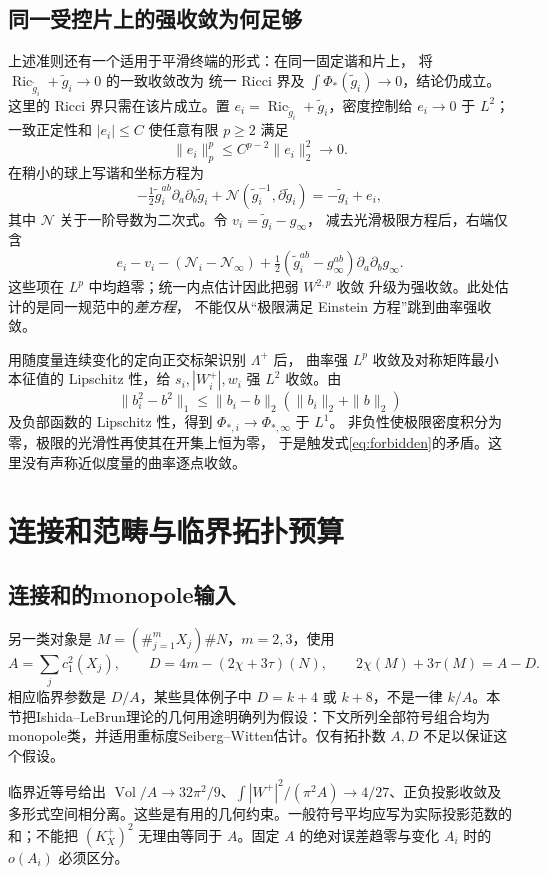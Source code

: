 \documentclass[UTF8,a4paper,11pt,fontset=fandol]{ctexart}
\numberwithin{equation}{section}
\theoremstyle{definition}
\newcommand{\Ric}{\operatorname{Ric}}
\newcommand{\Vol}{\operatorname{Vol}}
\begin{document}
\subsection{同一受控片上的强收敛为何足够}\label{sec:strong-density-bridge}
上述准则还有一个适用于平滑终端的形式：在同一固定谐和片上，
将 $\Ric_{\widetilde g_i}+\widetilde g_i\to0$ 的一致收敛改为
统一 Ricci 界及 $\int\Phi_*(\widetilde g_i)\to0$，结论仍成立。
这里的 Ricci 界只需在该片成立。置
$e_i=\Ric_{\widetilde g_i}+\widetilde g_i$，密度控制给 $e_i\to0$ 于 $L^2$；
一致正定性和 $|e_i|\le C$ 使任意有限 $p\ge2$ 满足
\[
\|e_i\|_p^p\le C^{p-2}\|e_i\|_2^2\longrightarrow0.
\]
在稍小的球上写谐和坐标方程为
\[
-\tfrac12\widetilde g_i^{ab}\partial_a\partial_b\widetilde g_i
 +\mathcal N(\widetilde g_i^{-1},\partial\widetilde g_i)
=-\widetilde g_i+e_i,
\]
其中 $\mathcal N$ 关于一阶导数为二次式。令 $v_i=\widetilde g_i-g_\infty$，
减去光滑极限方程后，右端仅含
\[
e_i-v_i-(\mathcal N_i-\mathcal N_\infty)
 +\tfrac12(\widetilde g_i^{ab}-g_\infty^{ab})\partial_a\partial_bg_\infty.
\]
这些项在 $L^p$ 中均趋零；统一内点估计因此把弱 $W^{2,p}$ 收敛
升级为强收敛。此处估计的是同一规范中的\emph{差方程}，
不能仅从“极限满足 Einstein 方程”跳到曲率强收敛。

用随度量连续变化的定向正交标架识别 $\Lambda^+$ 后，
曲率强 $L^p$ 收敛及对称矩阵最小本征值的 Lipschitz 性，给
$s_i,|W_i^+|,w_i$ 强 $L^2$ 收敛。由
\[
\|b_i^2-b^2\|_1\le\|b_i-b\|_2(\|b_i\|_2+\|b\|_2)
\]
及负部函数的 Lipschitz 性，得到 $\Phi_{*,i}\to\Phi_{*,\infty}$ 于 $L^1$。
非负性使极限密度积分为零，极限的光滑性再使其在开集上恒为零，
于是触发式\eqref{eq:forbidden}的矛盾。这里没有声称近似度量的曲率逐点收敛。

\section{连接和范畴与临界拓扑预算}
\subsection{连接和的monopole输入}
另一类对象是 $M=(\#_{j=1}^{m}X_j)\#N$，$m=2,3$，使用
\[
A=\sum_j c_1^2(X_j),\qquad D=4m-(2\chi+3\tau)(N),\qquad
2\chi(M)+3\tau(M)=A-D.
\]
相应临界参数是 $D/A$，某些具体例子中 $D=k+4$ 或 $k+8$，不是一律 $k/A$。本节把Ishida--LeBrun理论\cite{IL}的几何用途明确列为假设：下文所列全部符号组合均为monopole类，并适用重标度Seiberg--Witten估计。仅有拓扑数 $A,D$ 不足以保证这个假设。

临界近等号给出 $\Vol/A\to32\pi^2/9$、$\int|W^+|^2/(\pi^2A)\to4/27$、正负投影收敛及多形式空间相分离。这些是有用的几何约束。一般符号平均应写为实际投影范数的和；不能把 $(K_X^+)^2$ 无理由等同于 $A$。固定 $A$ 的绝对误差趋零与变化 $A_i$ 时的 $o(A_i)$ 必须区分。
\end{document}
